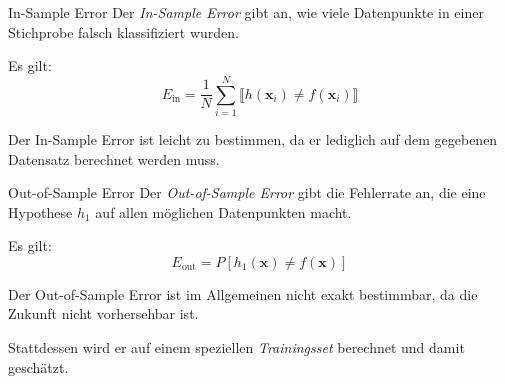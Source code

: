 \begin{defi}{In-Sample Error}
    Der \emph{In-Sample Error} gibt an, wie viele Datenpunkte in einer Stichprobe falsch klassifiziert wurden.

    Es gilt:
    \[
        E_\text{in} = \frac{1}{N} \sum_{i=1}^N \llbracket h(\mathbf{x}_i) \neq f(\mathbf{x}_i) \rrbracket
    \]

    Der In-Sample Error ist leicht zu bestimmen, da er lediglich auf dem gegebenen Datensatz berechnet werden muss.
\end{defi}

\begin{defi}{Out-of-Sample Error}
    Der \emph{Out-of-Sample Error} gibt die Fehlerrate an, die eine Hypothese $h_1$ auf allen möglichen Datenpunkten macht.

    Es gilt:
    \[
        E_\text{out} = P[h_1(\mathbf{x}) \neq f(\mathbf{x})]
    \]

    Der Out-of-Sample Error ist im Allgemeinen nicht exakt bestimmbar, da die Zukunft nicht vorhersehbar ist.

    Stattdessen wird er auf einem speziellen \emph{Trainingsset} berechnet und damit geschätzt.
\end{defi}

